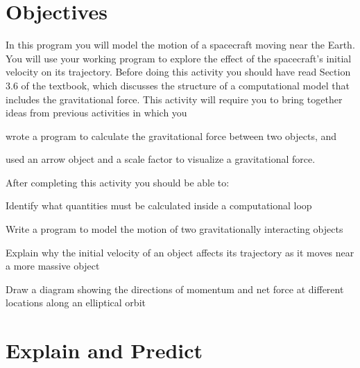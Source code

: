 \documentclass[10pt]{article}
\begin{document}
 

\begin{center}
{}
\end{center}

\section*{Objectives}

In this program you will model the motion of a spacecraft moving near the Earth. You will use your working program to explore the effect of the spacecraft's initial velocity on its trajectory. Before doing this activity you should have read Section 3.6 of the \MI textbook, which discusses the structure of a computational model that includes the gravitational force.  This activity will require you to bring together ideas from previous activities in which you 
\begin{inparaenum}[(1)]
\item wrote a program to calculate the gravitational force between two objects, and 
\item used an arrow object and a scale factor to visualize a gravitational force.\\
\end{inparaenum}

After completing this activity you should be able to:\\

\begin{compactitem}[\color{MIBlue}$\bullet$]
\item Identify what quantities must be calculated inside a computational loop
\item Write a program to model the motion of two gravitationally interacting objects
\item Explain why the initial velocity of an object affects its trajectory as it moves near a more massive object
\item Draw a diagram showing the directions of momentum and net force at different locations along an elliptical orbit
\end{compactitem}

\section{Explain and Predict}
\end{document}
